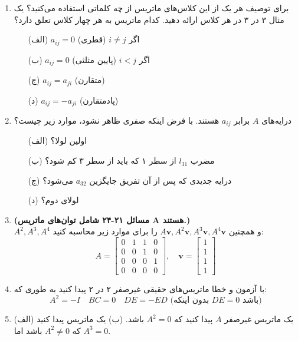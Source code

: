 \documentclass[12pt, a4paper]{book}
\begin{document}
\begin{enumerate}
		\item برای توصیف هر یک از این کلاس‌های ماتریس از چه کلماتی استفاده می‌کنید؟ یک مثال ۳ در ۳ در هر کلاس ارائه دهید. کدام ماتریس به هر چهار کلاس تعلق دارد؟
		\begin{itemize}
			\item[(الف)] $a_{ij} = 0$ اگر $i \neq j$ (قطری)
			\item[(ب)] $a_{ij} = 0$ اگر $i < j$ (پایین مثلثی)
			\item[(ج)] $a_{ij} = a_{ji}$ (متقارن)
			\item[(د)] $a_{ij} = -a_{ji}$ (پادمتقارن)
		\end{itemize}
		
		\item درایه‌های $A$ برابر $a_{ij}$ هستند. با فرض اینکه صفری ظاهر نشود، موارد زیر چیست؟
		\begin{itemize}
			\item[(الف)] اولین لولا؟
			\item[(ب)] مضرب $l_{31}$ از سطر ۱ که باید از سطر ۳ کم شود؟
			\item[(ج)] درایه جدیدی که پس از آن تفریق جایگزین $a_{32}$ می‌شود؟
			\item[(د)] لولای دوم؟
		\end{itemize}
		
		\item \textbf{(مسائل ۲۱-۲۴ شامل توان‌های ماتریس A هستند.)}\\
		$A^2, A^3, A^4$ و همچنین $A\mathbf{v}, A^2\mathbf{v}, A^3\mathbf{v}, A^4\mathbf{v}$ را برای موارد زیر محاسبه کنید:
		\[ A = \begin{bmatrix} 0 & 1 & 1 & 0 \\ 0 & 0 & 1 & 0 \\ 0 & 0 & 0 & 1 \\ 0 & 0 & 0 & 0 \end{bmatrix}, \quad \mathbf{v} = \begin{bmatrix} 1 \\ 1 \\ 1 \\ 1 \end{bmatrix} \]
		
		\item با آزمون و خطا ماتریس‌های حقیقی غیرصفر ۲ در ۲ پیدا کنید به طوری که:
		\[ A^2 = -I \quad BC=0 \quad DE = -ED \text{ (بدون اینکه } DE=0 \text{ باشد)} \]
		
		\item (الف) یک ماتریس غیرصفر $A$ پیدا کنید که $A^2=0$ باشد.
		(ب) یک ماتریس پیدا کنید که $A^2 \neq 0$ باشد اما $A^3=0$.
		

\end{enumerate}
\end{document}
